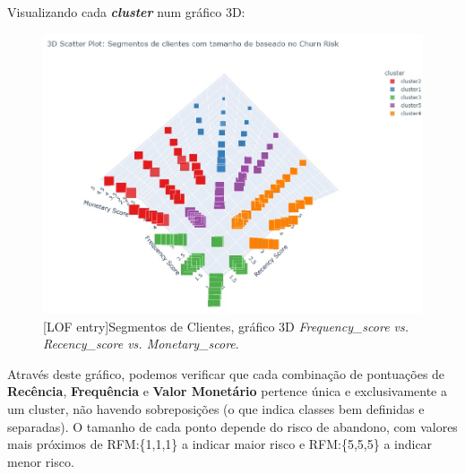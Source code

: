 \documentclass{easychair}
\begin{document}
Visualizando cada \textbf{\textit{cluster}} num gráfico 3D:

\begin{figure}[H]
    \begin{centering}
    \includegraphics[width=1\linewidth]{imagens/figure25.jpg}\label{cap-5-fig25}
    [LOF entry]{Segmentos de Clientes, gráfico 3D \textit{Frequency_score vs. Recency_score vs. Monetary_score}.}
    \label{fig25}
    \end{centering}
\end{figure}

Através deste gráfico, podemos verificar que cada combinação de pontuações de \textbf{Recência}, \textbf{Frequência} e \textbf{Valor Monetário} pertence única e exclusivamente a um cluster, não havendo sobreposições (o que indica classes bem definidas e separadas). O tamanho de cada ponto depende do risco de abandono, com valores mais próximos de RFM:\{1,1,1\} a indicar maior risco e RFM:\{5,5,5\} a indicar menor risco.
\end{document}
